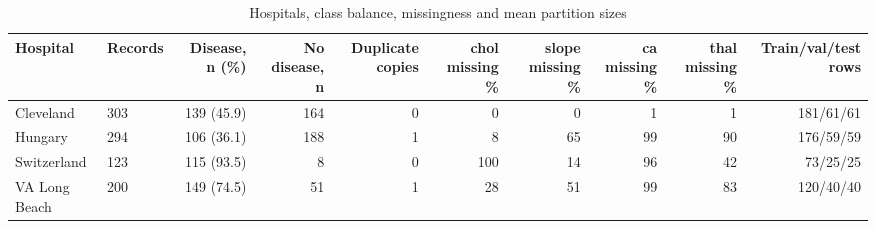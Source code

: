 \begin{table}[ht]
\centering
\small
\caption{Hospitals, class balance, missingness and mean partition sizes}
\label{tab:table1_dataset}
\begin{tabular}{llrrrrrrrr}
\toprule
Hospital & Records & Disease, n (\%) & No disease, n & Duplicate copies & chol missing \% & slope missing \% & ca missing \% & thal missing \% & Train/val/test rows \\
\midrule
Cleveland & 303 & 139 (45.9) & 164 & 0 & 0 & 0 & 1 & 1 & 181/61/61 \\
Hungary & 294 & 106 (36.1) & 188 & 1 & 8 & 65 & 99 & 90 & 176/59/59 \\
Switzerland & 123 & 115 (93.5) & 8 & 0 & 100 & 14 & 96 & 42 & 73/25/25 \\
VA Long Beach & 200 & 149 (74.5) & 51 & 1 & 28 & 51 & 99 & 83 & 120/40/40 \\
\bottomrule
\end{tabular}
\end{table}
